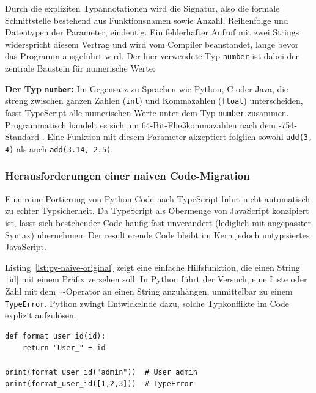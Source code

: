 Durch die expliziten Typannotationen wird die Signatur, also die formale Schnittstelle bestehend aus Funktionsnamen sowie Anzahl, Reihenfolge und Datentypen der Parameter, eindeutig. Ein fehlerhafter Aufruf mit zwei Strings widerspricht diesem Vertrag und wird vom Compiler beanstandet, lange bevor das Programm ausgeführt wird. Der hier verwendete Typ \texttt{number} ist dabei der zentrale Baustein für numerische Werte:

\begin{definition}
\label{def:ts-number}
\textbf{Der Typ \texttt{number}:} Im Gegensatz zu Sprachen wie Python, C oder Java, die streng zwischen ganzen Zahlen (\texttt{int}) und Kommazahlen (\texttt{float}) unterscheiden, fasst TypeScript alle numerischen Werte unter dem Typ \texttt{number} zusammen. Programmatisch handelt es sich um 64-Bit-Fließkommazahlen nach dem -754-Standard \autocite{ieee754_2019}. Eine Funktion mit diesem Parameter akzeptiert folglich sowohl \texttt{add(3, 4)} als auch \texttt{add(3.14, 2.5)}.
\end{definition}


\subsubsection{Herausforderungen einer naiven Code-Migration}
\label{subsubsec:naive-uebersetzung}

Eine reine Portierung von Python-Code nach TypeScript führt nicht automatisch zu echter Typsicherheit. Da TypeScript als Obermenge von JavaScript konzipiert ist, lässt sich bestehender Code häufig fast unverändert (lediglich mit angepasster Syntax) übernehmen. Der resultierende Code bleibt im Kern jedoch untypisiertes JavaScript. 

Listing~\ref{lst:py-naive-original} zeigt eine einfache Hilfsfunktion, die einen String \texttt|id| mit einem Präfix versehen soll. In Python führt der Versuch, eine Liste oder Zahl mit dem \texttt{+}-Operator an einen String anzuhängen, unmittelbar zu einem \texttt{TypeError}. Python zwingt Entwickelnde dazu, solche Typkonflikte im Code explizit aufzulösen.

\begin{listing}[htbp]
    \caption{Fehlschlagende String-Konkatenation in Python}
    \label{lst:py-naive-original}
    \begin{verbatim}
def format_user_id(id):
    return "User_" + id 

print(format_user_id("admin"))  # User_admin
print(format_user_id([1,2,3]))  # TypeError
    \end{verbatim}
\end{listing}

